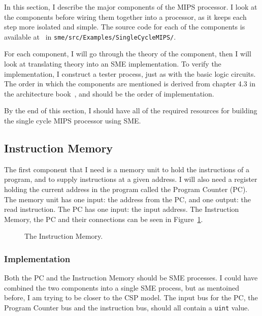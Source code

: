 In this section, I describe the major components of the MIPS
processor. I look at the components before wiring them together into a
processor, as it keeps each step more isolated and simple. The source code for
each of the components is available at~\cite{ref:github} in
\texttt{sme/src/Examples/SingleCycleMIPS/}.

For each component, I will go through the theory of the component, then I
will look at translating theory into an SME implementation. To verify the
implementation, I construct a tester process, just as with the basic logic
circuits.  The order in which the components are mentioned is derived from
chapter 4.3 in the architecture book~\cite{ref:ark}, and should be the order of
implementation.

By the end of this section, I should have all of the required resources for
building the single cycle MIPS processor using SME.

\subsection{Instruction Memory}
The first component that I need is a memory unit to hold the instructions of a
program, and to supply instructions at a given address. I will also need a
register holding the current address in the program called the Program Counter
(PC). The memory unit has one input: the address from the PC, and one output:
the read instruction. The PC has one input: the input address. The Instruction
Memory, the PC and their connections can be seen in Figure~\ref{fig:inst}.
\begin{figure}
    \centering
    \caption{The Instruction Memory.}
    \label{fig:inst}
\end{figure}

\subsubsection*{Implementation}
Both the PC and the Instruction Memory should be SME processes. I could have
combined the two components into a single SME process, but as mentoined before,
I am trying to be closer to the CSP model. The input bus for the PC, the Program
Counter bus and the instruction bus, should all contain a \texttt{uint} value.


